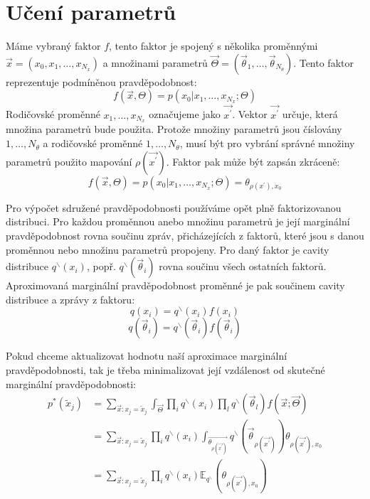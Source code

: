 \chapter{Učení parametrů}

Máme vybraný faktor $f$, tento faktor je spojený s několika proměnnými
$\vec{x} = (x_0, x_1, \dots, x_{N_x})$
a množinami parametrů
$\vec{\Theta} = (\vec{\theta}_1, \dots, \vec{\theta}_{N_\theta})$.
Tento faktor reprezentuje podmíněnou pravděpodobnost:
$$f(\vec{x}, \Theta) = p(x_0 | x_1, \dots, x_{N_x}; \Theta)$$
Rodičovské proměnné $x_1, \dots, x_{N_x}$ označujeme jako $\vec{x^\prime}$.
Vektor $\vec{x^\prime}$ určuje, která množina parametrů bude použita.
Protože množiny parametrů jsou číslovány $1, \dots, N_\theta$ a rodičovské
proměnné $1, \dots, N_\theta$, musí být pro vybrání správné množiny parametrů
použito mapování $\rho(\vec{x^\prime})$.
Faktor pak může být zapsán zkráceně:
$$f(\vec{x}, \Theta) = p(x_0 | x_1, \dots, x_{N_x}; \Theta) =
\theta_{\rho(x^\prime), x_0}$$

Pro výpočet sdružené pravděpodobnosti používáme opět plně faktorizovanou
distribuci.
Pro každou proměnnou anebo množinu parametrů je její marginální pravděpodobnost
rovna součinu zpráv, přicházejících z faktorů, které jsou s danou proměnnou
nebo množinu parametrů propojeny.
Pro daný faktor je cavity distribuce $q^\backslash(x_i)$, popř.
$q^\backslash(\vec{\theta}_i)$ rovna součinu všech ostatních faktorů.
Aproximovaná marginální pravděpodobnost proměnné je pak součinem cavity
distribuce a zprávy z faktoru:
$$q(x_i) = q^\backslash(x_i) f(x_i)$$
$$q(\vec{\theta}_i) = q^\backslash(\vec{\theta}_i) f(\vec{\theta}_i)$$

Pokud chceme aktualizovat hodnotu naší aproximace marginální pravděpodobnosti,
tak je třeba minimalizovat její vzdálenost od skutečné marginální
pravděpodobnosti:
\begin{align}
p^*(\tilde{x}_j) & = \sum_{\vec{x}: x_j = \tilde{x}_j} \int_{\vec{\Theta}}
    \prod_i q^\backslash(x_i) \prod_l q^\backslash(\vec{\theta}_l) f(\vec{x};
    \vec{\Theta}) \\
& = \sum_{\vec{x}: x_j = \tilde{x}_j} \prod_i q^\backslash(x_i)
    \int_{\vec{\theta_{\rho(\vec{x^\prime})}}}
    q^\backslash(\vec{\theta}_{\rho(\vec{x^\prime})})
    \theta_{\rho(\vec{x^\prime}), x_0} \\
& = \sum_{\vec{x}: x_j = \tilde{x}_j} \prod_i q^\backslash(x_i)
    \mathbb{E}_{q^\backslash} (\theta_{\rho(\vec{x^\prime}), x_0})
\end{align}

